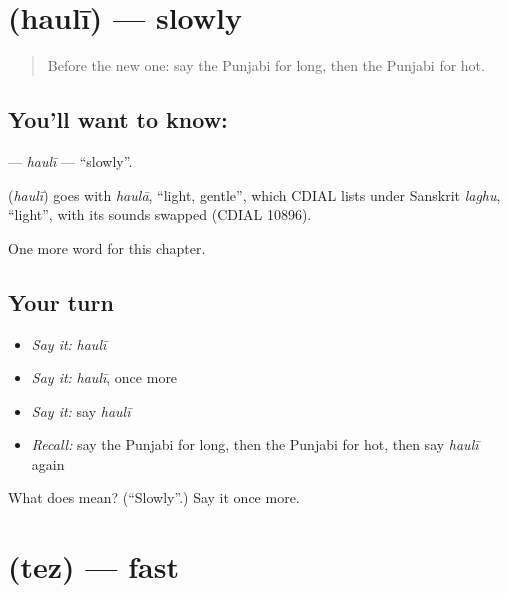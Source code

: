 \section[\texorpdfstring{\pa{ਹੌਲੀ} (haulī)}{ਹੌਲੀ (haulī)}]{ (haulī) — slowly}

\label{lesson:PA-C80-hauli}



\begin{quote}
Before the new one: say the Punjabi for long, then the Punjabi for hot.
\end{quote}

\subsection*{You'll want to know: }
\textbf{} — \emph{haulī} — \textquotedblleft{}slowly\textquotedblright{}.

\begin{cousinweb}
\textbf{} (\emph{haulī}) goes with \emph{haulā}, \textquotedblleft{}light, gentle\textquotedblright{}, which CDIAL lists under Sanskrit \emph{laghu}, \textquotedblleft{}light\textquotedblright{}, with its sounds swapped (CDIAL 10896).
\end{cousinweb}

\begin{grammarlens}[title={What you've built}]
One more word for this chapter.
\end{grammarlens}

\subsection*{Your turn}
\begin{itemize}
\raggedright
  \item \emph{Say it:} \emph{haulī}
  \item \emph{Say it:} \emph{haulī}, once more
  \item \emph{Say it:} say \emph{haulī}
  \item \emph{Recall:} say the Punjabi for long, then the Punjabi for hot, then say \emph{haulī} again
\end{itemize}

\begin{tcolorbox}[breakable,colback=teal!4,colframe=teal!35!black,title={Before you move on}]
What does  mean? (\textquotedblleft{}Slowly\textquotedblright{}.) Say it once more.
\end{tcolorbox}
\section[\texorpdfstring{\pa{ਤੇਜ਼} (tez)}{ਤੇਜ਼ (tez)}]{ (tez) — fast}

